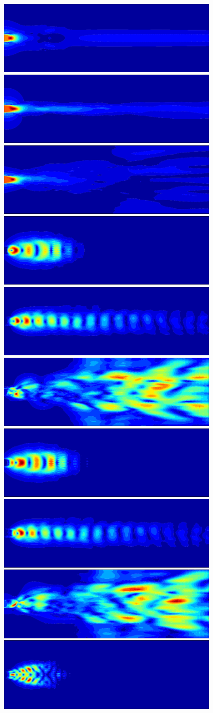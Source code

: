 \documentclass[3p,times,procedia]{elsarticle}
\begin{document}
\begin{figure}
  \begin{center}
    \includegraphics[width=0.31\linewidth]{figs/Re265-01}
    \includegraphics[width=0.31\linewidth]{figs/Re2580-01}
    \includegraphics[width=0.31\linewidth]{figs/Re40000-01} \\
    \includegraphics[width=0.31\linewidth]{figs/Re265-02}
    \includegraphics[width=0.31\linewidth]{figs/Re2580-02}
    \includegraphics[width=0.31\linewidth]{figs/Re40000-02} \\
    \includegraphics[width=0.31\linewidth]{figs/Re265-03}
    \includegraphics[width=0.31\linewidth]{figs/Re2580-03}
    \includegraphics[width=0.31\linewidth]{figs/Re40000-03} \\
    \includegraphics[width=0.31\linewidth]{figs/Re265-04}

\end{center}
\end{figure}
\end{document}
